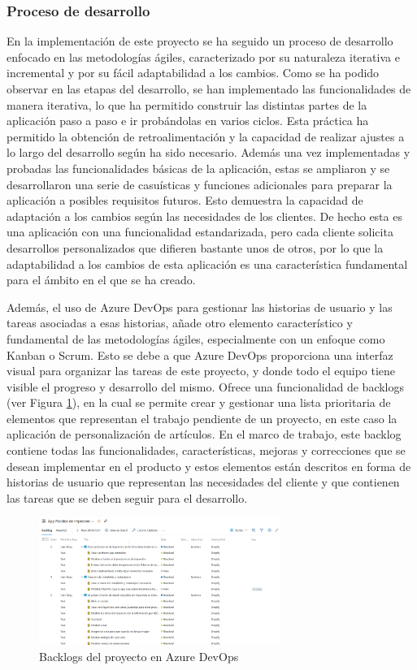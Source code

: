 \documentclass[11pt]{article}
\begin{document}
\subsubsection{Proceso de desarrollo}
En la implementación de este proyecto se ha seguido un proceso de desarrollo enfocado en las metodologías ágiles, caracterizado por su naturaleza iterativa e incremental y por su fácil adaptabilidad a los cambios. Como se ha podido observar en las etapas del desarrollo,
se han implementado las funcionalidades de manera iterativa, lo que ha permitido construir las distintas partes de la aplicación paso a paso e ir probándolas en varios ciclos.
Esta práctica ha permitido la obtención de retroalimentación y la capacidad de realizar ajustes a lo largo del desarrollo según ha sido necesario.
Además una vez implementadas y probadas las funcionalidades básicas de la aplicación, estas se ampliaron y se desarrollaron una serie de casuísticas y funciones adicionales para preparar la aplicación a posibles
requisitos futuros. Esto demuestra la capacidad de adaptación a los cambios según las necesidades de los clientes. De hecho esta es una aplicación con una funcionalidad estandarizada, pero 
cada cliente solicita desarrollos personalizados que difieren bastante unos de otros, por lo que la adaptabilidad a los cambios de esta aplicación es una característica fundamental para el ámbito en el que se ha creado.

Además, el uso de Azure DevOps para gestionar las historias de usuario y las tareas asociadas a esas historias, añade otro elemento característico y fundamental de las metodologías ágiles, especialmente con un enfoque como Kanban o Scrum.
Esto se debe a que Azure DevOps proporciona una interfaz visual para organizar las tareas de este proyecto, y donde todo el equipo tiene visible el progreso y desarrollo del mismo.
Ofrece una funcionalidad de backlogs (ver Figura \ref{fig:3}), en la cual se permite crear y gestionar una lista prioritaria de elementos que representan el trabajo pendiente de un proyecto, en este caso la aplicación de personalización de artículos. 
En el marco de trabajo, este backlog contiene todas las funcionalidades, características, mejoras y correcciones que se desean implementar
en el producto y estos elementos están descritos en forma de historias de usuario que representan las necesidades del cliente y que contienen las 
tareas que se deben seguir para el desarrollo.

\begin{figure}[H]
    \centering
    \includegraphics[width=0.7\textwidth]{imagenes/Backlogs de Devops.png}
    \caption{\label{fig:3}Backlogs del proyecto en Azure DevOps}
    \vspace{\fill}
\end{figure}
\end{document}
